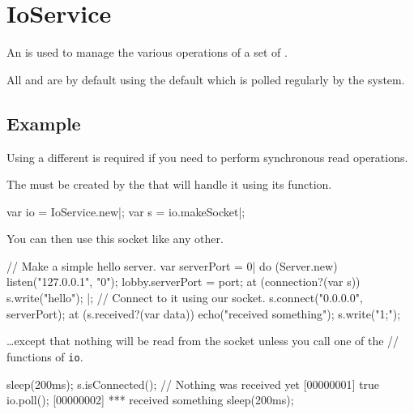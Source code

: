 
\section{IoService}

An  is used to manage the various operations of a set of
.

All  and  are by default using the
default  which is polled regularly by the system.

\subsection{Example}

Using a different  is required if you need to perform
synchronous read operations.

The  must be created by the  that
will handle it using its  function.

\begin{urbiscript}
var io = IoService.new|;
var s = io.makeSocket|;
\end{urbiscript}

You can then use this socket like any other.

\begin{urbiscript}
// Make a simple hello server.
var serverPort = 0|
do (Server.new)
{
  listen("127.0.0.1", "0");
  lobby.serverPort = port;
  at (connection?(var s))
  {
    s.write("hello");
  }
}|;
// Connect to it using our socket.
s.connect("0.0.0.0", serverPort);
at (s.received?(var data))
  echo("received something");
s.write("1;");
\end{urbiscript}

\noindent
\ldots except that nothing will be read from the socket unless you call one
of the // functions of
\lstinline|io|.

\begin{urbiscript}
sleep(200ms);
s.isConnected(); // Nothing was received yet
[00000001] true
io.poll();
[00000002] *** received something
sleep(200ms);
\end{urbiscript}

